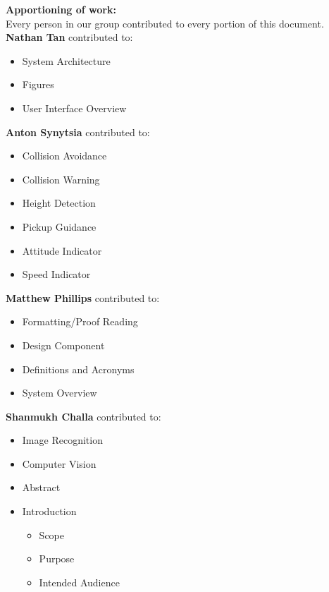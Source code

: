 \documentclass[onecolumn, draftclsnofoot, 10pt, compsoc]{IEEEtran}
\begin{document}
\newpage
{}
\tableofcontents
\listoffigures
\clearpage

\noindent\textbf{Apportioning of work:}\\
\noindent Every person in our group contributed to every portion of this document.\\

\noindent\textbf{Nathan Tan} contributed to:
\begin{itemize}
    \item System Architecture
    \item Figures
    \item User Interface Overview
\end{itemize}

\noindent\textbf{Anton Synytsia} contributed to:
\begin{itemize}
    \item Collision Avoidance
    \item Collision Warning
    \item Height Detection
    \item Pickup Guidance
    \item Attitude Indicator
    \item Speed Indicator
\end{itemize}

\noindent\textbf{Matthew Phillips} contributed to:
\begin{itemize}
  \item Formatting/Proof Reading
  \item Design Component
  \item Definitions and Acronyms
  \item System Overview
\end{itemize}

\noindent\textbf{Shanmukh Challa} contributed to:
\begin{itemize}
  \item Image Recognition
  \item Computer Vision
  \item Abstract
  \item Introduction
  \begin{itemize}
    \item Scope
    \item Purpose
    \item Intended Audience
  \end{itemize}
\end{itemize}
\end{document}
